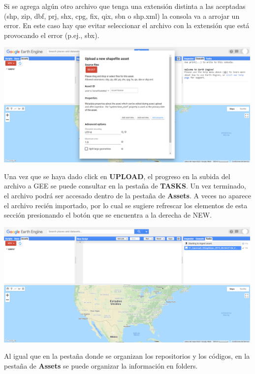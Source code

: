 \documentclass[
]{article}
\begin{document}
\begin{tipblock}
Si se agrega algún otro archivo que tenga una extensión distinta a las
aceptadas (shp, zip, dbf, prj, shx, cpg, fix, qix, sbn o shp.xml) la
consola va a arrojar un error. En este caso hay que evitar seleccionar
el archivo con la extensión que está provocando el error (p.ej., sbx).

\end{tipblock}

\includegraphics[width=500px]{Img/Asset2}

Una vez que se haya dado click en \textbf{UPLOAD}, el progreso en la
subida del archivo a GEE se puede consultar en la pestaña de
\textbf{TASKS}. Un vez terminado, el archivo podrá ser accesado dentro
de la pestaña de \textbf{Assets}. A veces no aparece el archivo recién
importado, por lo cual se sugiere refrescar los elementos de esta
sección presionando el botón que se encuentra a la derecha de NEW.

\includegraphics[width=500px]{Img/Asset3}

\begin{tipblock}
Al igual que en la pestaña donde se organizan los repositorios y los
códigos, en la pestaña de \textbf{Assets} se puede organizar la
información en folders.

\end{tipblock}
\end{document}
